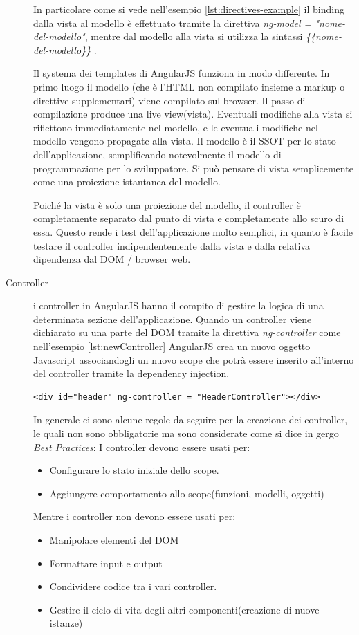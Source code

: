 \begin{description}
In particolare come si vede nell'esempio \ref{lst:directives-example} il binding dalla vista al modello è effettuato tramite la direttiva \emph{ng-model = "nome-del-modello"}, mentre dal modello alla vista si utilizza la sintassi \emph{ \{\{nome-del-modello\}\} }.

Il systema dei templates di AngularJS funziona in modo differente. In primo luogo il modello (che è l'HTML non compilato insieme a  markup o direttive supplementari) viene compilato sul browser. Il passo di compilazione produce una live view(vista). Eventuali modifiche alla vista si riflettono immediatamente nel modello, e le eventuali modifiche nel modello vengono propagate alla vista. Il modello è il SSOT per lo stato dell'applicazione, semplificando notevolmente il modello di programmazione per lo sviluppatore. Si può pensare di vista semplicemente come una proiezione istantanea del modello.

Poiché la vista è solo una proiezione del modello, il controller è completamente separato dal punto di vista e completamente allo scuro di essa. Questo rende i test dell'applicazione molto semplici, in quanto è facile testare il controller indipendentemente dalla vista e dalla relativa dipendenza dal DOM / browser web.

\item[Controller] i controller in AngularJS hanno il compito di gestire la logica di una determinata sezione dell'applicazione. Quando un controller viene dichiarato su una parte del DOM tramite la direttiva \emph{ng-controller} come nell'esempio \ref{lst:newController} AngularJS crea un nuovo oggetto Javascript associandogli un nuovo scope che potrà essere inserito all'interno del controller tramite la dependency injection. 

\begin{lstlisting}[caption={Associazione tra un elemento del DOM e un controller}, label={lst:newController}]
	<div id="header" ng-controller = "HeaderController"></div>
\end{lstlisting}
In generale ci sono alcune regole da seguire per la creazione dei controller, le quali non sono obbligatorie ma sono considerate come si dice in gergo \emph{Best Practices}:
I controller devono essere usati per:
\begin{itemize}
\item Configurare lo stato iniziale dello scope.
\item Aggiungere comportamento allo scope(funzioni, modelli, oggetti)
\end{itemize}
Mentre i controller non devono essere usati per:
\begin{itemize}
\item Manipolare elementi del DOM
\item Formattare input e output
\item Condividere codice tra i vari controller.
\item Gestire il ciclo di vita degli altri componenti(creazione di nuove istanze)
\end{itemize}


\end{description}
